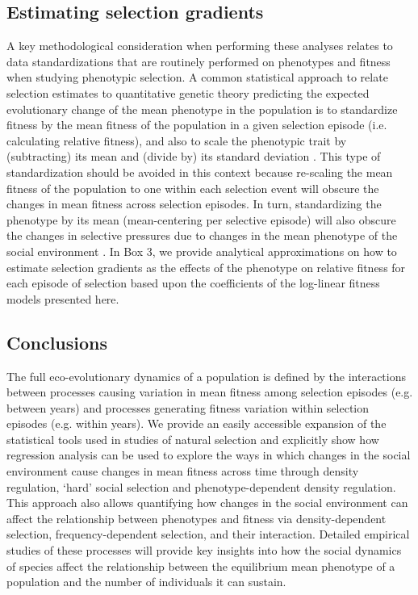 \documentclass{article}
\begin{document}
	\subsection{Estimating selection gradients}
	A key methodological consideration when performing these analyses relates to data standardizations that are routinely performed on phenotypes and fitness when studying phenotypic selection. A common statistical approach to relate selection estimates to quantitative genetic theory predicting the expected evolutionary change of the mean phenotype in the population is to standardize fitness by the mean fitness of the population in a given selection episode (i.e. calculating relative fitness), and also to scale the phenotypic trait by (subtracting) its mean and (divide by) its standard deviation \citep{DeLisle2017}. This type of standardization should be avoided in this context because re-scaling the mean fitness of the population to one within each selection event will obscure the changes in mean fitness across selection episodes. In turn, standardizing the phenotype by its mean (mean-centering per selective episode) will also obscure the changes in selective pressures due to changes in the mean phenotype of the social environment \citep{Araya-Ajoy2020}. In Box 3, we provide analytical approximations on how to estimate selection gradients as the effects of the phenotype on relative fitness for each episode of selection based upon the coefficients of the log-linear fitness models presented here.
	
	\subsection{Conclusions}
	The full eco-evolutionary dynamics of a population is defined by the interactions between processes causing variation in mean fitness among selection episodes (e.g. between years) and processes generating fitness variation within selection episodes (e.g. within years). We provide an easily accessible expansion of the statistical tools used in studies of natural selection and explicitly show how regression analysis can be used to explore the ways in which changes in the social environment cause changes in mean fitness across time through density regulation, `hard' social selection and phenotype-dependent density regulation. This approach also allows quantifying how changes in the social environment can affect the relationship between phenotypes and fitness via density-dependent selection, frequency-dependent selection, and their interaction. Detailed empirical studies of these processes will provide key insights into how the social dynamics of species affect the relationship between the equilibrium mean phenotype of a population and the number of individuals it can sustain. 
	
\end{document}
